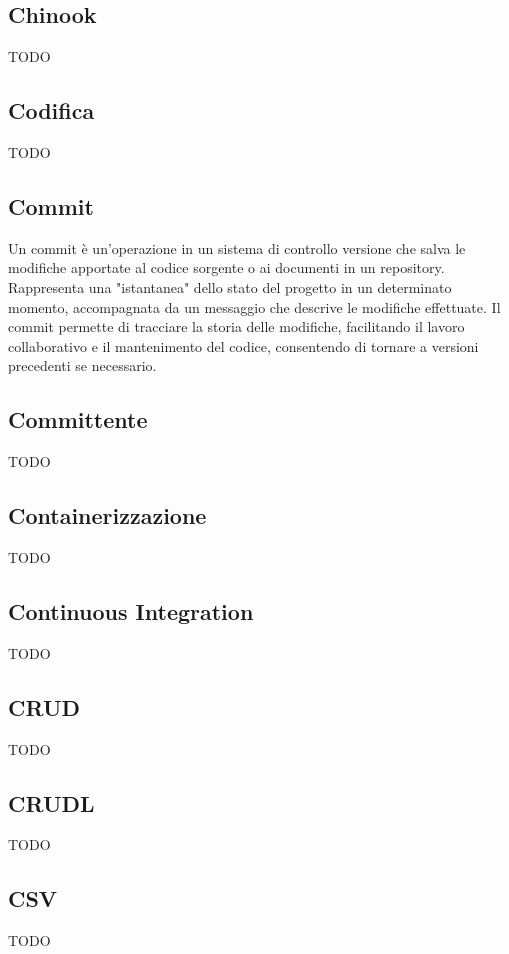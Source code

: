 \subsection*{Chinook}
TODO

\vspace{2em}
\subsection*{Codifica}
TODO

\vspace{2em}
\subsection*{Commit}
Un commit è un'operazione in un sistema di controllo versione che salva le modifiche apportate al codice sorgente o ai documenti in un repository. Rappresenta una "istantanea" dello stato del progetto in un determinato momento, accompagnata da un messaggio che descrive le modifiche effettuate. Il commit permette di tracciare la storia delle modifiche, facilitando il lavoro collaborativo e il mantenimento del codice, consentendo di tornare a versioni precedenti se necessario.

\vspace{2em}
\subsection*{Committente}
TODO

\vspace{2em}
\subsection*{Containerizzazione}
TODO

\vspace{2em}
\subsection*{Continuous Integration}
TODO

\vspace{2em}
\subsection*{CRUD}
TODO

\vspace{2em}
\subsection*{CRUDL}
TODO

\vspace{2em}
\subsection*{CSV}
TODO
